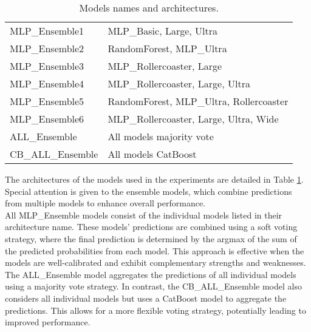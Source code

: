 \begin{table}[h]
\begin{tabular}{|ll|}
        MLP\_Ensemble1     & MLP\_Basic, Large, Ultra                   \\ 
        MLP\_Ensemble2     & RandomForest, MLP\_Ultra                   \\ 
        MLP\_Ensemble3     & MLP\_Rollercoaster, Large                  \\ 
        MLP\_Ensemble4     & MLP\_Rollercoaster, Large, Ultra           \\ 
        MLP\_Ensemble5     & RandomForest, MLP\_Ultra, Rollercoaster    \\ 
        MLP\_Ensemble6     & MLP\_Rollercoaster, Large, Ultra, Wide     \\ 
        ALL\_Ensemble      & All models majority vote                   \\ 
        CB\_ALL\_Ensemble  & All models CatBoost                        \\ \hline
    \end{tabular}
    \caption{Models names and architectures.}
    \label{tab:models}
\end{table}

The architectures of the models used in the experiments are detailed in Table \ref{tab:models}.
Special attention is given to the ensemble models, which combine predictions from multiple models
to enhance overall performance.\\
\noindent
All MLP\_Ensemble models consist of the individual models listed in their architecture name.
These models’ predictions are combined using a soft voting strategy, where the final prediction is
determined by the argmax of the sum of the predicted probabilities from each model. This approach is
effective when the models are well-calibrated and exhibit complementary strengths and weaknesses.\\
\noindent
The ALL\_Ensemble model aggregates the predictions of all individual models using a majority vote strategy.
In contrast, the CB\_ALL\_Ensemble model also considers all individual models but uses a CatBoost model to
aggregate the predictions. This allows for a more flexible voting strategy, potentially leading to improved
performance.